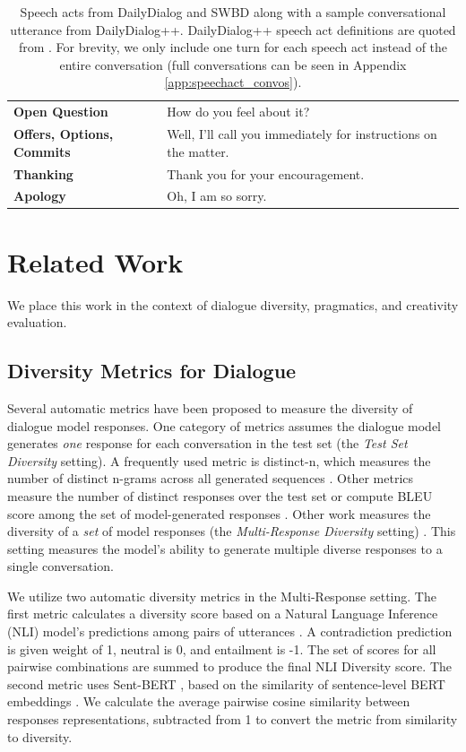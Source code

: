 \documentclass[11pt]{article}
\begin{document}
\begin{table}[ht!]
\begin{tabular}{|p{4cm}|p{10.5cm}|}
     \textbf{Open Question}   & How do you feel about it?\\
     \textbf{Offers, Options, Commits}    & Well, I'll call you immediately for instructions on the matter.\\
     \textbf{Thanking}    & Thank you for your encouragement.\\
     \textbf{Apology}    & Oh, I am so sorry.\\\hline
    \end{tabular}
    \caption{Speech acts from DailyDialog and SWBD along with a sample  conversational utterance from DailyDialog++.  DailyDialog++ speech act definitions are quoted from \citet{amanova-etal-2016-creating}.  For brevity, we only include one turn for each speech act instead of the entire conversation (full conversations can be seen in Appendix \ref{app:speechact_convos}).}
    \label{tab:speechact_table}
\end{table}


\section{Related Work}\label{sec:related}
We place this work in the context of dialogue diversity, pragmatics, and creativity evaluation.

\subsection{Diversity Metrics for Dialogue}
Several automatic metrics have been proposed to measure the diversity of dialogue model responses. One category of metrics assumes the dialogue model generates \textit{one} response for each conversation in the test set (the \textit{Test Set Diversity} setting).  A frequently used metric is distinct-n, which measures the number of distinct n-grams across  all generated sequences \cite{li-etal-2016-diversity}.  Other metrics measure the number of distinct responses over the test set \cite{cao-clark-2017-latent} or compute BLEU score among the set of model-generated responses \cite{zhu-et-al-acm}. 
Other work measures the diversity of a \textit{set} of model responses (the \textit{Multi-Response Diversity} setting) \cite{zhang-etal-2019-syntax-infused, tevet-berant-2021-evaluating}.  This setting measures the model's ability to generate multiple diverse responses to a single conversation.

We utilize two automatic diversity metrics in the Multi-Response setting.  
The first metric calculates a diversity score based on a Natural Language Inference (NLI) model's predictions among pairs of utterances 
\cite{nli-placeholder}.  A contradiction prediction is given weight of 1, neutral is 0, and entailment is -1.  The set of scores for all pairwise combinations are summed to produce the final NLI Diversity score. 
The second metric uses Sent-BERT \cite{tevet-berant-2021-evaluating}, based on the similarity of sentence-level BERT embeddings \cite{reimers-gurevych-2019-sentence}.  We calculate  the average pairwise cosine similarity between responses representations, subtracted from 1 to convert the metric from similarity to diversity.
\end{document}
